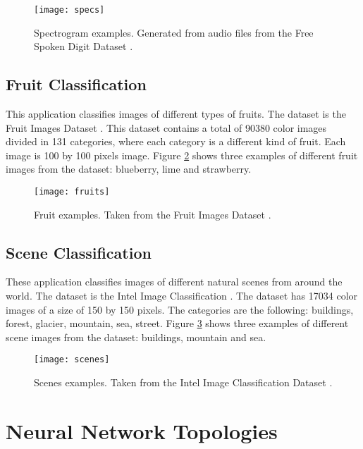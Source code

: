 \begin{figure}[thbp]
	\centering
	\texttt{[image: specs]}
	\caption{Spectrogram examples. Generated from audio files from the Free Spoken Digit Dataset \cite{fsdd}.}
	\label{fig:specs}
\end{figure}

\subsection{Fruit Classification}

This application classifies images of different types of fruits. The dataset is the Fruit Images Dataset \cite{fruit_ds}. This dataset contains a total of 90380 color images divided in 131 categories, where each category is a different kind of fruit. Each image is 100 by 100 pixels image. Figure \ref{fig:fruits} shows three examples of different fruit images from the dataset: blueberry, lime and strawberry.

\begin{figure}[thbp]
	\centering
	\texttt{[image: fruits]}
	\caption{Fruit examples. Taken from the Fruit Images Dataset \cite{fruit_ds}.}
	\label{fig:fruits}
\end{figure}

\subsection{Scene Classification}

These application classifies images of different natural scenes from around the world. The dataset is the Intel Image Classification \cite{intel_ds}. The dataset has 17034 color images of a size of 150 by 150 pixels. The categories are the following: buildings, forest, glacier, mountain, sea, street. Figure \ref{fig:scenes} shows three examples of different scene images from the dataset: buildings, mountain and sea.

\begin{figure}[thbp]
	\centering
	\texttt{[image: scenes]}
	\caption{Scenes examples. Taken from the Intel Image Classification Dataset \cite{intel_ds}.}
	\label{fig:scenes}
\end{figure}

\section{Neural Network Topologies}

